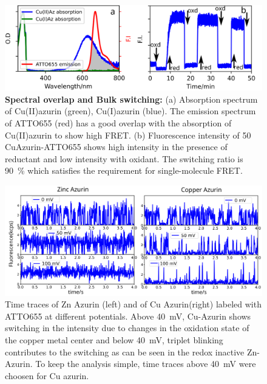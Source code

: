 \begin{figure}[ht]
  \centering
  \includegraphics[width=\textwidth]{spectral_overlap_switching}
  \makeatletter
  \renewcommand{\fnum@figure}{\figurename~S\thefigure}
  \makeatother
  \caption{ \textbf{Spectral overlap and Bulk switching:} (a) Absorption spectrum of Cu(II)azurin (green), Cu(I)azurin (blue).
  The emission spectrum of ATTO655 (red) has a good overlap with the absorption of Cu(II)azurin to show high FRET. 
  (b) Fluorescence intensity of \SI{50}{\nM} CuAzurin-ATTO655 shows high intensity in the presence of reductant and low 
  intensity with oxidant.
  The switching ratio is \SI{90}{\percent} which satisfies the requirement for single-molecule FRET.
  }
  \label{SIfig: switching}
\end{figure}
\begin{figure}[ht]
  \centering
  \includegraphics[width=\textwidth,keepaspectratio]{SI_timetrace_Zn_Cu}
  \makeatletter
  \renewcommand{\fnum@figure}{\figurename~S\thefigure}
  \makeatother
  \caption{Time traces of Zn Azurin (left) and of Cu Azurin(right) labeled with ATTO655 at different potentials. 
  Above \SI{40}{\mV}, Cu-Azurin shows switching in the intensity due to changes in the oxidation state of the copper metal center and below \SI{40}{\mV}, triplet blinking contributes to the switching as can be seen in the redox inactive Zn-Azurin.
  To keep the analysis simple, time traces above \SI{40}{\mV} were choosen for Cu azurin.
  }
  \label{SIfig:tracecomparision}
\end{figure}
